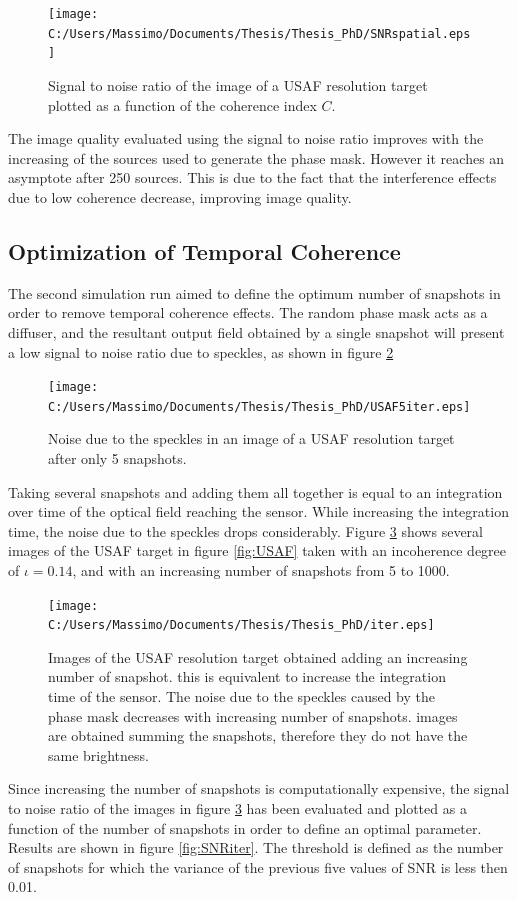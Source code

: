  \begin{figure}[H]
 	\centering
 	\texttt{[image: C:/Users/Massimo/Documents/Thesis/Thesis\_PhD/SNRspatial.eps]}
 	\caption{\label{fig:spatialsnr1}Signal to noise ratio of the image of a USAF resolution target plotted as a function of the coherence index $C$.}
 \end{figure}
 The image quality evaluated using the signal to noise ratio improves with the increasing of the sources used to generate the phase mask. However it reaches an asymptote after 250 sources. This is due to the fact that the interference effects due to low coherence decrease, improving image quality. 
 \newpage
 \subsection{Optimization of Temporal Coherence}
The second simulation run aimed to define the optimum number of snapshots in order to remove temporal coherence effects. The random phase mask acts as a diffuser, and the resultant output field obtained by a single snapshot will present a low signal to noise ratio due to speckles, as shown in figure \ref{fig:speckle}
\begin{figure}[H]
	\centering
	\texttt{[image: C:/Users/Massimo/Documents/Thesis/Thesis\_PhD/USAF5iter.eps]}
	\caption{\label{fig:speckle}Noise due to the speckles in an image of a USAF resolution target after only 5 snapshots.}
\end{figure}
Taking several snapshots and adding them all together is equal to an integration over time of the optical field reaching the sensor. While increasing the integration time, the noise due to the speckles drops considerably. Figure \ref{fig:iter} shows several images of the USAF target in figure \ref{fig:USAF} taken with an incoherence degree of $\iota=0.14$, and with an increasing number of snapshots from 5 to 1000.
 \begin{figure}[H]
 	\centering
 	\texttt{[image: C:/Users/Massimo/Documents/Thesis/Thesis\_PhD/iter.eps]}
 	\caption{\label{fig:iter}Images of the USAF resolution target obtained adding an increasing number of snapshot. this is equivalent to increase the integration time of the sensor. The noise due to the speckles caused by the phase mask decreases with increasing number of snapshots. images are obtained summing the snapshots, therefore they do not have the same brightness.}
 \end{figure}
 Since increasing the number of snapshots is computationally expensive, the signal to noise ratio of the images in figure \ref{fig:iter} has been evaluated and plotted as a function of the number of snapshots in order to define an optimal parameter. Results are shown in figure \ref{fig:SNRiter}. The threshold is defined as the number of snapshots for which the variance of the previous five values of SNR is less then 0.01.
